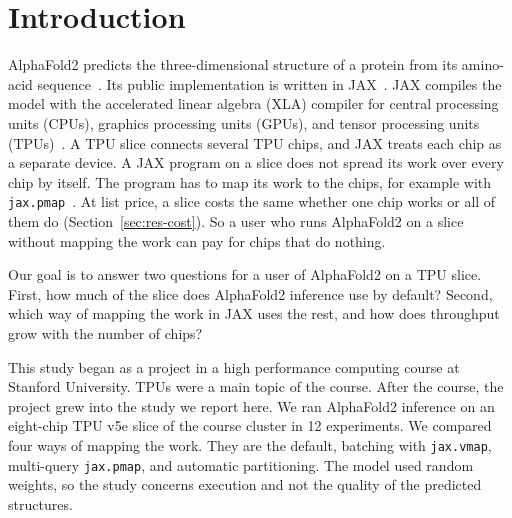 \section{Introduction}\label{sec:intro}

AlphaFold2 predicts the three-dimensional structure of a protein from its amino-acid sequence~\cite{jumper2021alphafold}.
Its public implementation is written in JAX~\cite{alphafoldrepo}. JAX compiles the model with the accelerated linear
algebra (XLA) compiler for central processing units (CPUs), graphics processing units (GPUs), and tensor processing
units (TPUs)~\cite{frostig2018jax}. A TPU slice connects several TPU chips, and JAX treats each chip as a separate
device. A JAX program on a slice does not spread its work over every chip by itself. The program has to map its work
to the chips, for example with \texttt{jax.pmap}~\cite{jaxpmap}. At list price, a slice costs the same whether one
chip works or all of them do (Section~\ref{sec:res-cost}). So a user who runs AlphaFold2 on a slice without mapping
the work can pay for chips that do nothing.

Our goal is to answer two questions for a user of AlphaFold2 on a TPU slice. First, how much of the slice does
AlphaFold2 inference use by default? Second, which way of mapping the work in JAX uses the rest, and how does
throughput grow with the number of chips?

This study began as a project in a high performance computing course at Stanford University. TPUs were a main topic of
the course. After the course, the project grew into the study we report here.
We ran AlphaFold2 inference on an eight-chip TPU v5e slice of the course cluster in 12 experiments. %
We compared four ways of mapping the
work. They are the default, batching with \texttt{jax.vmap}, multi-query \texttt{jax.pmap}, and automatic
partitioning. The model used random weights, so the study concerns execution and not the quality of the predicted
structures.

